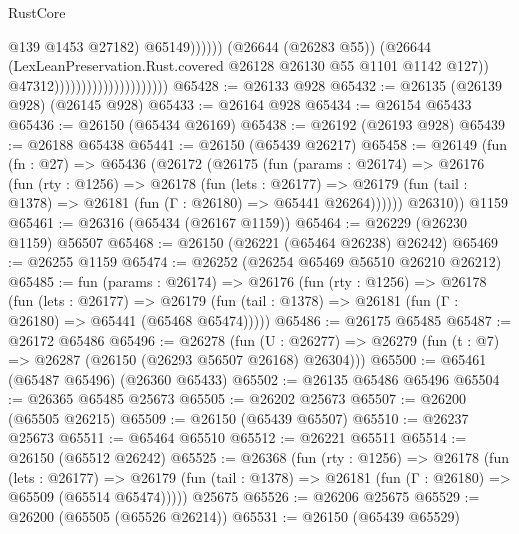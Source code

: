 \begin{lexlean}{RustCore}
\begin{coremodule}
                                                            @139
                                                            @1453
                                                            @27182)
                                                          @65149))))))
                                              (@26644 (@26283 @55))
                                              (@26644
                                                (LexLeanPreservation.Rust.covered
                                                  @26128
                                                  @26130
                                                  @55
                                                  @1101
                                                  @1142
                                                  @127))
                                              @47312)))))))))))))))))))))
@65428 := @26133 @928
@65432 := @26135 (@26139 @928) (@26145 @928)
@65433 := @26164 @928
@65434 := @26154 @65433
@65436 := @26150 (@65434 @26169)
@65438 := @26192 (@26193 @928)
@65439 := @26188 @65438
@65441 := @26150 (@65439 @26217)
@65458 := @26149
    (fun (fn : @27) =>
    @65436
      (@26172
        (@26175
          (fun (params : @26174) =>
          @26176
            (fun (rty : @1256) =>
            @26178
              (fun (lets : @26177) =>
              @26179 (fun (tail : @1378) => @26181 (fun (Γ : @26180) => @65441 @26264))))))
        @26310))
    @1159
@65461 := @26316 (@65434 (@26167 @1159))
@65464 := @26229 (@26230 @1159) @56507
@65468 := @26150 (@26221 (@65464 @26238) @26242)
@65469 := @26255 @1159
@65474 := @26252 (@26254 @65469 @56510 @26210 @26212)
@65485 := fun (params : @26174) =>
  @26176
    (fun (rty : @1256) =>
    @26178
      (fun (lets : @26177) =>
      @26179 (fun (tail : @1378) => @26181 (fun (Γ : @26180) => @65441 (@65468 @65474)))))
@65486 := @26175 @65485
@65487 := @26172 @65486
@65496 := @26278
    (fun (U : @26277) => @26279 (fun (t : @7) => @26287 (@26150 (@26293 @56507 @26168) @26304)))
@65500 := @65461 (@65487 @65496) (@26360 @65433)
@65502 := @26135 @65486 @65496
@65504 := @26365 @65485 @25673
@65505 := @26202 @25673
@65507 := @26200 (@65505 @26215)
@65509 := @26150 (@65439 @65507)
@65510 := @26237 @25673
@65511 := @65464 @65510
@65512 := @26221 @65511
@65514 := @26150 (@65512 @26242)
@65525 := @26368
    (fun (rty : @1256) =>
    @26178
      (fun (lets : @26177) =>
      @26179 (fun (tail : @1378) => @26181 (fun (Γ : @26180) => @65509 (@65514 @65474)))))
    @25675
@65526 := @26206 @25675
@65529 := @26200 (@65505 (@65526 @26214))
@65531 := @26150 (@65439 @65529)

\end{coremodule}
\end{lexlean}
